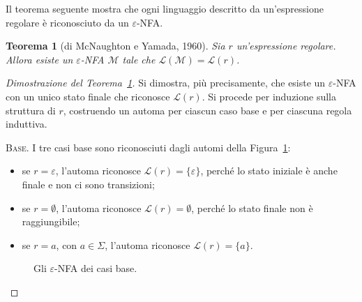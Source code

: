 \documentclass[a4paper, 11pt, oneside]{book}
\theoremstyle{formale}
\newtheorem{theorem}{Teorema}
\begin{document}
    Il teorema seguente mostra che ogni linguaggio descritto da un'espressione regolare
    \`e riconosciuto da un $\varepsilon$-NFA.

    \begin{theorem}[di McNaughton e Yamada, 1960]
        \label{thm:mcnaughton-yamada}
        Sia $r$ un'espressione regolare. Allora esiste un $\varepsilon$-NFA $\mathcal{M}$
        tale che $\mathcal{L}(\mathcal{M}) = \mathcal{L}(r)$.
    \end{theorem}

    \begin{proof}[Dimostrazione del Teorema~\ref{thm:mcnaughton-yamada}]
        Si dimostra, pi\`u precisamente, che esiste un $\varepsilon$-NFA con un unico stato
        finale che riconosce $\mathcal{L}(r)$. Si procede per induzione sulla struttura di
        $r$, costruendo un automa per ciascun caso base e per ciascuna regola induttiva.

        \textsc{Base}. I tre casi base sono riconosciuti dagli automi della
        Figura~\ref{fig:re-base}:
        \begin{itemize}
            \item se $r = \varepsilon$, l'automa riconosce $\mathcal{L}(r) =
                \{\varepsilon\}$, perch\'e lo stato iniziale \`e anche finale e non ci sono
                transizioni;
            \item se $r = \emptyset$, l'automa riconosce $\mathcal{L}(r) = \emptyset$,
                perch\'e lo stato finale non \`e raggiungibile;
            \item se $r = a$, con $a \in \Sigma$, l'automa riconosce
                $\mathcal{L}(r) = \{a\}$.
        \end{itemize}

        \begin{figure}[H]
            \centering
            \caption{Gli $\varepsilon$-NFA dei casi base.}
            \label{fig:re-base}
        \end{figure}


\end{proof}
\end{document}
